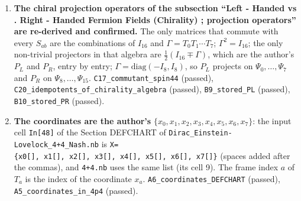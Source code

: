 \documentclass[
  10pt,
]{article}
\begin{document}
\begin{enumerate}
  close under commutation with the structure constants of \(so(4,4)\)
  and act on the \(T_c\) as the vector representation: they are a basis
  of the Lie algebra \(spin(4,4) \cong so(4,4)\), which is the Lie
  algebra of Pin(4,4) (and of Spin(4,4)). Each exponential
  \(\exp(\theta S_{ab})\) is a product of two unit vectors, so it lies
  in Pin(4,4); the exponentials generate the identity component
  \(\mathrm{Spin}_0(4,4)\); together with the two reflections \(T_0\)
  and \(T_4\) they generate all of Pin(4,4), whose four components are
  identified by exact invariants. Precisely stated: the scaled
  commutators generate Pin(4,4) as its Lie algebra and, by
  exponentiation, its identity component; no product of exponentials
  leaves that component, so the reflections are needed for the other
  three. \texttt{C21\_SAB\_independent} (passed),
  \texttt{C24\_spin44\_closure} (passed),
  \texttt{C26\_exponentials\_two\_unit\_vectors} (passed),
  \texttt{C28\_exponentials\_in\_identity\_component} (passed),
  \texttt{C27\_pin44\_components} (passed).
\item
  \textbf{The chiral projection operators of the subsection ``Left -
  Handed vs . Right - Handed Fermion Fields (Chirality) ; projection
  operators'' are re-derived and confirmed.} The only matrices that
  commute with every \(S_{ab}\) are the combinations of \(I_{16}\) and
  \(\Gamma = T_0 T_1 \cdots T_7\); \(\Gamma^2 = I_{16}\); the only
  non-trivial projectors in that algebra are
  \(\tfrac12(I_{16} \mp \Gamma)\), which are the author's \(P_L\) and
  \(P_R\), entry by entry; \(\Gamma = \mathrm{diag}(-I_8, I_8)\), so
  \(P_L\) projects on \(\Psi_0, \dots, \Psi_7\) and \(P_R\) on
  \(\Psi_8, \dots, \Psi_{15}\). \texttt{C17\_commutant\_spin44}
  (passed), \texttt{C20\_idempotents\_of\_chirality\_algebra} (passed),
  \texttt{B9\_stored\_PL} (passed), \texttt{B10\_stored\_PR} (passed).
\item
  \textbf{The coordinates are the author's}
  \(\{x_0, x_1, x_2, x_3, x_4, x_5, x_6, x_7\}\): the input cell
  \texttt{In{[}48{]}} of the Section DEFCHART of
  \texttt{Dirac\_Einstein-Lovelock\_4+4\_Nash.nb} is
  \texttt{X=\{x0{[}{]},\ x1{[}{]},\ x2{[}{]},\ x3{[}{]},\ x4{[}{]},\ x5{[}{]},\ x6{[}{]},\ x7{[}{]}\}}
  (spaces added after the commas), and \texttt{4+4.nb} uses the same
  list (its cell 9). The frame index \(a\) of \(T_a\) is the index of
  the coordinate \(x_a\). \texttt{A6\_coordinates\_DEFCHART} (passed),
  \texttt{A5\_coordinates\_in\_4p4} (passed).
\end{enumerate}
\end{document}

